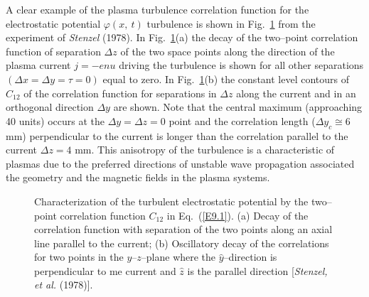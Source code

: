 \documentclass[a4paper,openany,12pt]{book}
\begin{document}
A clear example of the plasma turbulence correlation function for the electrostatic potential $\varphi(x,\ t)$ turbulence is shown in Fig.~\ref{F9.2} from the experiment of \emph{Stenzel} (1978). In Fig.~\ref{F9.2}(a) the decay of the two--point correlation function of separation $\Delta z$ of the two space points along the direction of the plasma current 
$j=-enu$ driving the turbulence is shown for all other separations $(\Delta x=\Delta y=\tau=0)$ equal to zero. In Fig.~\ref{F9.2}(b) the constant level contours of $C_{12}$ of the correlation function for separations in $\Delta z$ along the current and in an orthogonal direction $\Delta y$ are shown. Note that the central maximum (approaching 40 units) occurs at the $\Delta y=\Delta z=0$ point and the correlation length ($\Delta y_c\cong 6$ mm) perpendicular to the current is longer than the correlation parallel to the current $\Delta z=4$ mm. This anisotropy of the turbulence is a characteristic of plasmas due to the preferred directions of unstable wave propagation associated the geometry and the magnetic fields in the plasma systems.
%
\begin{figure}[H]
\centerline{}
\caption{Characterization of the turbulent electrostatic potential by the two--point correlation function $C_{12}$ in Eq.~(\ref{E9.1}). (a) Decay of the correlation function with separation of the two points along an axial line parallel to the current; (b) Oscillatory decay of the correlations for two points in the $y$--$z$--plane where the $\widehat y$--direction is perpendicular to me current and $\widehat z$ is the parallel direction [\emph{Stenzel, et al.} (1978)].}
\label{F9.2}
\end{figure}
%
\end{document}
